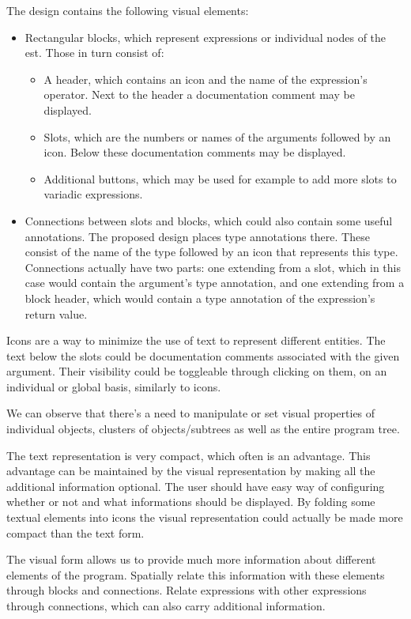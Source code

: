 The design contains the following visual elements:
\begin{itemize}
	\item Rectangular blocks, which represent expressions or individual nodes of the \acrshort{est}. Those in turn consist of:
	\begin{itemize}
		\item A header, which contains an icon and the name of the expression's operator. Next to the header a documentation comment may be displayed.
		\item Slots, which are the numbers or names of the arguments followed by an icon. Below these documentation comments may be displayed.
		\item Additional buttons, which may be used for example to add more slots to variadic expressions.
	\end{itemize}
	\item Connections between slots and blocks, which could also contain
          some useful annotations. The proposed design places type annotations
          there. These consist of the name of the type followed by an icon that
          represents this type. Connections actually have two parts: one
          extending from a slot, which in this case would contain the argument's
          type annotation, and one extending from a block header, which would
          contain a type annotation of the expression's return value.
\end{itemize}

Icons are a way to minimize the use of text to represent different entities. The text below the slots could be documentation comments associated with the
given argument. Their visibility could be toggleable through clicking on them,
on an individual or global basis, similarly to icons.

We can observe that there's a need to manipulate or set visual properties of
individual objects, clusters of objects/subtrees as well as the entire program
tree.

The text representation is very compact, which often is an advantage. This
advantage can be maintained by the visual representation by making all the
additional information optional. The user should have easy way of configuring
whether or not and what informations should be displayed. By folding some
textual elements into icons the visual representation could actually be made
more compact than the text form.

The visual form allows us to provide much more information about different
elements of the program. Spatially relate this information with these elements
through blocks and connections. Relate expressions with other expressions
through connections, which can also carry additional information.

